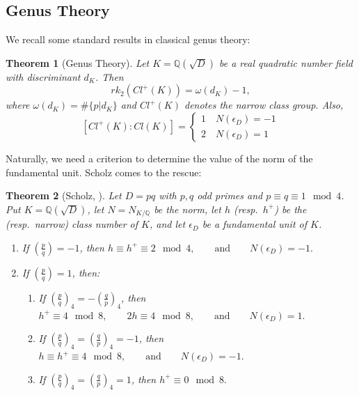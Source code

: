 \documentclass{article}
\numberwithin{equation}{section}
\theoremstyle{plain}  %
\newtheorem{theorem}{Theorem}[section]
\theoremstyle{definition}
\newcommand{\Q}{\mathbb{Q}}
\begin{document}
\subsection{Genus Theory}
 We recall some standard results in classical genus theory:

\begin{theorem}[Genus Theory]\label{th: Genus theory}
Let $K=\Q(\sqrt{D})$ be a real quadratic number field with discriminant $d_K$. Then  
$$rk_{2}(Cl^+(K))=\omega (d_{K})-1,$$
where $\omega (d_{K})=\#\{p | d_{K}\}$ and $Cl^+(K)$ denotes the narrow class group. Also,
$$[Cl^{+}(K):Cl(K)]=\begin{cases}
     1 \quad N(\epsilon_{D})=-1 
     \\ 2 \quad N(\epsilon_{D})=1 
    \end{cases}$$ 

    
\end{theorem}

Naturally, we need a criterion to determine the value of the norm of the fundamental unit. Scholz comes to the rescue:

\begin{theorem}[Scholz, \cite{MR1545490, MR309898}]\label{th: Nm(ed)=-1}
Let $D=pq$ with $p,q$ odd primes and $p\equiv q\equiv 1 \mod 4$.
Put $K=\Q(\sqrt{D})$, let $N=N_{K/\Q}$ be the norm,
let $h$ (resp.\ $h^+$) be the (resp.\ narrow) class number of $K$,
and let $\epsilon_D$ be a fundamental unit of $K$.

\begin{enumerate}
\item If $\left(\frac{p}{q}\right)=-1$, then
$h \equiv h^+ \equiv 2 \mod 4,
\qquad\text{and}\qquad
N(\epsilon_D)=-1.$

\item If $\left(\frac{p}{q}\right)=1$, then:
\begin{enumerate}
\item[(i)] If $\left(\frac{p}{q}\right)_4 = -\left(\frac{q}{p}\right)_4$, then $h^+ \equiv 4 \mod 8,
\qquad 2h \equiv 4 \mod 8,
\qquad\text{and}\qquad
N(\epsilon_D)=1.$

\item[(ii)] If $\left(\frac{p}{q}\right)_4=\left(\frac{q}{p}\right)_4=-1$, then
$h \equiv h^+ \equiv 4 \mod 8,
\qquad\text{and}\qquad
N(\epsilon_D)=-1.$

\item[(iii)] If $\left(\frac{p}{q}\right)_4=\left(\frac{q}{p}\right)_4=1$, then
$h^+ \equiv 0 \mod 8.$
\end{enumerate}
\end{enumerate}


\end{theorem}
\end{document}

